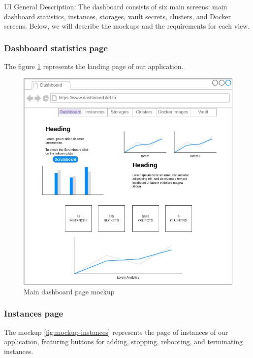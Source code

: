 UI General Description:
The dashboard consists of six main screens: main dashboard statistics, instances, storages, vault secrets, clusters, and Docker screens. Below, we will describe the mockups and the requirements for each view.

\subsubsection{Dashboard statistics page}

The figure \hyperref[fig:mockup-dashboard]{\ref{fig:mockup-dashboard}} represents the landing page of our application.
\begin{figure}[h]
  \center
  \includegraphics[width=13cm]{mockup-dashboard.png}
  \caption{Main dashboard page mockup}
  \label{fig:mockup-dashboard}
\end{figure}
\vspace{50mm}

\subsubsection{Instances page}

The mockup \hyperref[fig:mockup-instances]{\ref{fig:mockup-instances}} represents the page of instances of our application, featuring buttons for adding, stopping, rebooting, and terminating instances.

